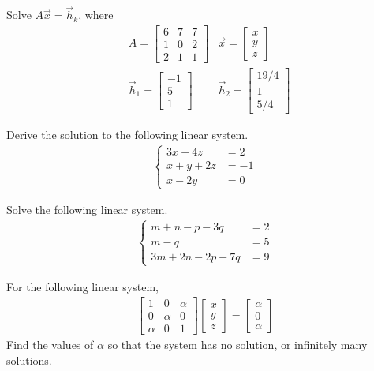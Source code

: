 \begin{Exercise}
Solve $A\vec{x} = \vec{h}_k$, where
\begin{align*}
&A =
\begin{bmatrix}
6 & 7 & 7\\
1 & 0 & 2\\
2 & 1 & 1
\end{bmatrix}
&\vec{x} =
\begin{bmatrix}
x\\
y\\
z
\end{bmatrix} \\
& \vec{h}_1 =
\begin{bmatrix}
-1 \\
5 \\
1
\end{bmatrix}
& \vec{h}_2 =
\begin{bmatrix}
19/4 \\
1 \\
5/4
\end{bmatrix}
\end{align*}
\end{Exercise}

\begin{Exercise}
Derive the solution to the following linear system.
\begin{align*}
\begin{cases}
3x + 4z &= 2\\
x + y + 2z &= -1\\
x - 2y &= 0
\end{cases}
\end{align*}
\end{Exercise}

\begin{Exercise}
Solve the following linear system.
\begin{align*}
\begin{cases}
m + n - p - 3q &= 2\\
m - q &= 5\\
3m + 2n - 2p - 7q &= 9
\end{cases}
\end{align*}
\end{Exercise}

\begin{Exercise}
For the following linear system,
\begin{align*}
\begin{bmatrix}
1 & 0 & \alpha \\
0 & \alpha & 0 \\
\alpha & 0 & 1
\end{bmatrix}
\begin{bmatrix}
x \\
y \\
z
\end{bmatrix}
=
\begin{bmatrix}
\alpha \\
0 \\
\alpha
\end{bmatrix}   
\end{align*}
Find the values of $\alpha$ so that the system has no solution, or infinitely many solutions.
\end{Exercise}

